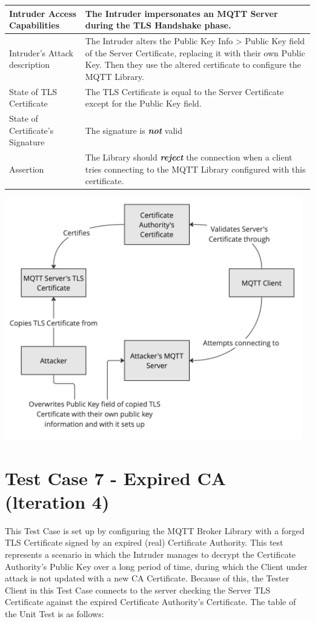\documentclass[binding=0.6cm,noexaminfo]{sapthesis}
\begin{document}
\begin{center}
\begin{tabular}{| p{6cm} | p{6cm} |}
\hline
Intruder Access Capabilities & The Intruder impersonates an MQTT Server during the TLS Handshake phase. \\
\hline
Intruder’s Attack description & The Intruder alters the Public Key Info > Public Key field of the Server Certificate, replacing it with their own Public Key. Then they use the altered certificate to configure the MQTT Library. \\
\hline
State of TLS Certificate & The TLS Certificate is equal to the Server Certificate except for the Public Key field. \\
\hline
State of Certificate’s Signature & The signature is \textbf{\textit{not}} valid \\
\hline
Assertion & The Library should \textbf{\textit{reject}} the connection when a client tries connecting to the MQTT Library configured with this certificate. \\
\hline
\end{tabular}
\end{center}

\includegraphics[width=13cm]{TC6}

\section{Test Case 7 - Expired CA (lteration 4)}
This Test Case is set up by configuring the MQTT Broker Library with a forged TLS Certificate signed by an expired (real) Certificate Authority. This test represents a scenario in which the Intruder manages to decrypt the Certificate Authority’s Public Key over a long period of time, during which the Client under attack is not updated with a new CA Certificate. Because of this, the Tester Client in this Test Case connects to the server checking the Server TLS Certificate against the expired Certificate Authority’s Certificate. The table of the Unit Test is as follows:
\end{document}

